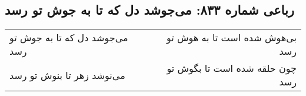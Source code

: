 \begin{center}
\section*{رباعی شماره ۸۳۳: می‌جوشد دل که تا به جوش تو رسد}
\label{sec:0833}
\begin{longtable}{l p{0.5cm} r}
می‌جوشد دل که تا به جوش تو رسد
&&
بی‌هوش شده است تا به هوش تو رسد
\\
می‌نوشد زهر تا بنوش تو رسد
&&
چون حلقه شده است تا بگوش تو رسد
\\
\end{longtable}
\end{center}
